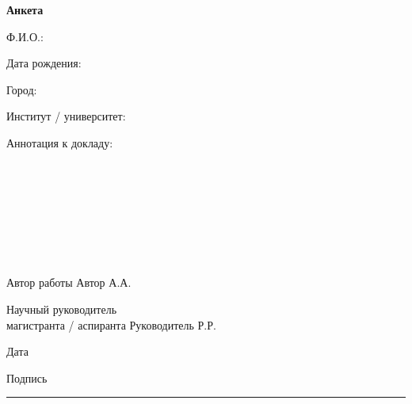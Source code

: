 \documentclass{article}
\begin{document}
\thispagestyle{empty}
\centering
\Large{} \textbf{Анкета}

\normalsize{}
\raggedright{}
\noindent Ф.И.О.:\hrulefill{}

\noindent Дата рождения:\hrulefill{}

\noindent Город:\hrulefill{}

\noindent Институт / университет:\hrulefill{}\\
\hrulefill{} 

\vspace{1cm}
\noindent Аннотация к докладу:\hrulefill{}\\
\hrulefill{}\\
\hrulefill{}\\
\hrulefill{}\\
\hrulefill{}\\
\hrulefill{}\\
\hrulefill{}\\
\hrulefill{}\\
\hrulefill{}\\

\vspace{6cm}
\noindent Автор работы \hfill Автор А.А.

\noindent Научный руководитель\\ магистранта / аспиранта \hfill Руководитель Р.Р.

\vspace{1cm}
Дата

Подпись \hfill \rule{4cm}{0.25pt}
\end{document}
